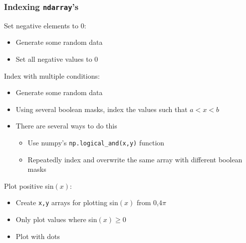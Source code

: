 \documentclass{beamer}
\newcommand{\code}[1]{\texttt{#1}}
\begin{document}
\begin{frame}	
	\frametitle{Indexing \code{ndarray}'s}
	
	\begin{exampleblock}{Set negative elements to 0:}
		\begin{itemize}
			\footnotesize
			\item Generate some random data
			\item Set all negative values to 0
		\end{itemize}
	\end{exampleblock}
	
	\begin{exampleblock}{Index with multiple conditions:}
		\begin{itemize}
			\footnotesize
			\item Generate some random data
			\item Using several boolean masks, index the values such that $a<x<b$
			\item There are several ways to do this
			\begin{itemize}
				\footnotesize
				\item Use numpy's \code{np.logical\_and(x,y)} function
				\item Repeatedly index and overwrite the same array with different boolean masks
			\end{itemize}
		\end{itemize}
	\end{exampleblock}
	
	\begin{exampleblock}{Plot positive sin$(x)$:}
		\begin{itemize}
			\footnotesize
			\item Create \code{x,y} arrays for plotting sin$(x)$ from 0,$4\pi$
			\item Only plot values where sin$(x)\ge0$
			\item Plot with dots
		\end{itemize}
	\end{exampleblock}
	
\end{frame}







\end{document}
